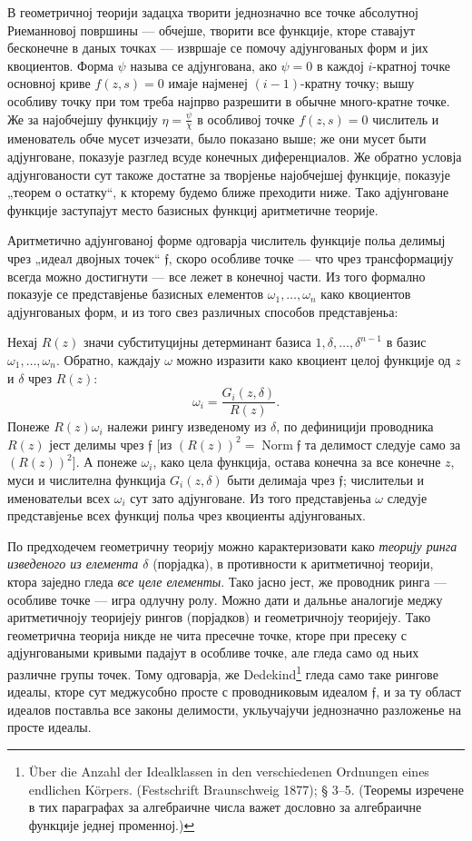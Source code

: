 ﻿\documentclass[11pt]{article}
\providecommand{\frf}{\mathfrak f}
\begin{document}
В геометричној теорији задацха творити једнозначно все точке абсолутној Риеманновој површины --- обчејше, творити все функције, кторе ставајут бесконечне в даных точках --- извршаје се помочу адјунгованых форм и јих квоциентов. Форма \(\psi\) называ се адјунгована, ако \(\psi=0\) в каждој \(i\)-кратној точке основној криве \(f(z,s)=0\) имаје најменеј \((i-1)\)-кратну точку; вышу особливу точку при том треба најпрво разрешити в обычне много-кратне точке. Же за најобчејшу функцију \(\eta=\frac{\psi}{\chi}\) в особливој точке \(f(z,s)=0\) числитель и именователь обче мусет изчезати, было показано выше; же они мусет быти адјунговане, показује разглед всуде конечных диференциалов. Же обратно условја адјунгованости сут такоже достатне за творјенье најобчејшеј функције, показује „теорем о остатку“, к кторему будемо ближе преходити ниже. Тако адјунговане функције заступајут место базисных функциј аритметичне теорије.

Аритметично адјунгованој форме одговарја числитель функције польа делимыј чрез „идеал двојных точек“ \(\frf\), скоро особливе точке --- что чрез трансформацију всегда можно достигнути --- все лежет в конечној части. Из того формално показује се представјенье базисных елементов \(\omega_1,\ldots,\omega_n\) како квоциентов адјунгованых форм, и из того свез различных способов представјеньа:

Нехај \(R(z)\) значи субституцијны детерминант базиса \(1,\delta,\ldots,\delta^{n-1}\) в базис \(\omega_1,\ldots,\omega_n\). Обратно, каждају \(\omega\) можно изразити како квоциент целој функције од \(z\) и \(\delta\) чрез \(R(z)\):
\[
\omega_i=\frac{G_i(z,\delta)}{R(z)}.
\]
Понеже \(R(z)\omega_i\) належи рингу изведеному из \(\delta\), по дефиницији проводника \(R(z)\) јест делимы чрез \(\frf\) [из \((R(z))^2=\operatorname{Norm}\frf\) та делимост следује само за \((R(z))^2\)]. А понеже \(\omega_i\), како цела функција, остава конечна за все конечне \(z\), муси и числителна функција \(G_i(z,\delta)\) быти делимаја чрез \(\frf\); числительи и именовательи всех \(\omega_i\) сут зато адјунговане. Из того представјеньа \(\omega\) следује представјенье всех функциј польа чрез квоциенты адјунгованых.

По предходечем геометричну теорију можно карактеризовати како {\itshape теорију ринга изведеного из елемента \(\delta\)} (порјадка), в противности к аритметичној теорији, ктора заједно гледа {\itshape все целе елементы}. Тако јасно јест, же проводник ринга --- особливе точке --- игра одлучну ролу. Можно дати и дальнье аналогије меджу аритметичноју теоријеју рингов (порјадков) и геометричноју теоријеју. Тако геометрична теорија никде не чита пресечне точке, кторе при пресеку с адјунговаными кривыми падајут в особливе точке, але гледа само од ньих различне групы точек. Тому одговарја, же Dedekind\footnote{Über die Anzahl der Idealklassen in den verschiedenen Ordnungen eines endlichen Körpers. (Festschrift Braunschweig 1877); § 3--5. (Теоремы изречене в тих параграфах за алгебраичне числа важет дословно за алгебраичне функције једнеј променној.)} гледа само таке рингове идеалы, кторе сут меджусобно просте с проводниковым идеалом \(\frf\), и за ту област идеалов поставльа все законы делимости, укльучајучи једнозначно разложенье на просте идеалы.
\end{document}
